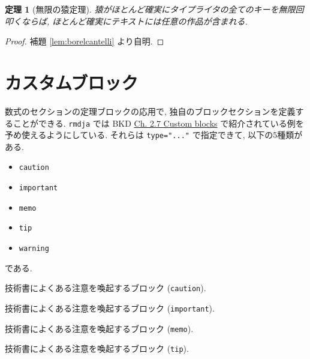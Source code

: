 \documentclass[
]{bxjsbook}
\providecommand{\tightlist}{%
  \setlength{\itemsep}{0pt}\setlength{\parskip}{0pt}}
\newenvironment{infobox}[1]{\begin{itemize}\renewcommand{\labelitemi}{\raisebox{-.7\height}[0pt][0pt]{%
  {\setkeys{Gin}{width=3em,keepaspectratio}\texttt{[image: \_latex/\_img/\#1]}}}}
  \setlength{\fboxsep}{1em}
  \begin{greyblock}
  \item
  }{\end{greyblock}\end{itemize}
}
\newenvironment{memo}{\begin{infobox}{memo}}{\end{infobox}}
\newenvironment{caution}{\begin{infobox}{caution}}{\end{infobox}}
\newenvironment{important}{\begin{infobox}{important}}{\end{infobox}}
\newenvironment{tip}{\begin{infobox}{tip}}{\end{infobox}}
\newtheorem{theorem}{定理}[chapter]
\theoremstyle{definition}
\theoremstyle{definition}
\theoremstyle{definition}
\theoremstyle{remark}
\begin{document}
\begin{theorem}[無限の猿定理]
\protect\hypertarget{thm:theorem1}{}{\label{thm:theorem1}
{}
}猿がほとんど確実にタイプライタの全てのキーを無限回叩くならば,
ほとんど確実にテキストには任意の作品が含まれる. \end{theorem}

\begin{proof}
{}補題 \ref{lem:borelcantelli} より自明.
\end{proof}

\hypertarget{ux30abux30b9ux30bfux30e0ux30d6ux30edux30c3ux30af}{%
\section{カスタムブロック}\label{ux30abux30b9ux30bfux30e0ux30d6ux30edux30c3ux30af}}

数式のセクションの定理ブロックの応用で,
独自のブロックセクションを定義することができる. \texttt{rmdja} では BKD
\href{https://bookdown.org/yihui/bookdown/custom-blocks.html}{Ch. 2.7
Custom blocks} で紹介されている例を予め使えるようにしている. それらは
\texttt{type="..."} で指定できて, 以下の5種類がある.

\begin{itemize}
\tightlist
\item
  \texttt{caution}
\item
  \texttt{important}
\item
  \texttt{memo}
\item
  \texttt{tip}
\item
  \texttt{warning}
\end{itemize}

である.

\begin{caution}
技術書によくある注意を喚起するブロック (\texttt{caution}).
\end{caution}

\begin{important}
技術書によくある注意を喚起するブロック (\texttt{important}).
\end{important}

\begin{memo}
技術書によくある注意を喚起するブロック (\texttt{memo}).
\end{memo}

\begin{tip}
技術書によくある注意を喚起するブロック (\texttt{tip}).
\end{tip}
\end{document}
